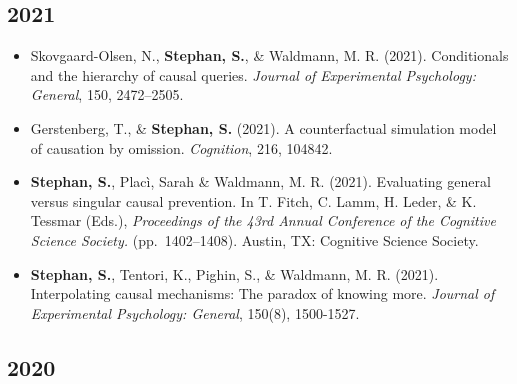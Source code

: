 \documentclass[
]{article}
\begin{document}
\hypertarget{section-6}{%
\subsection{2021}\label{section-6}}

\begin{itemize}
\item
  Skovgaard-Olsen, N., \textbf{Stephan, S.}, \& Waldmann, M. R. (2021).
  Conditionals and the hierarchy of causal queries. \emph{Journal of
  Experimental Psychology: General}, 150, 2472--2505.
  {\href{https://philarchive.org/archive/SKOCAT-2}{}}
  {\href{https://osf.io/fa9rj/}{}}
\item
  Gerstenberg, T., \& \textbf{Stephan, S.} (2021). A counterfactual
  simulation model of causation by omission. \emph{Cognition}, 216,
  104842.
  {\href{https://cicl.stanford.edu/papers/gerstenberg2021omission.pdf}{}}
  {\href{https://psyarxiv.com/wmh4c/}{}}
  {\href{https://osf.io/jubdz/}{}}
  {\href{https://github.com/cicl-stanford/omission}{}}
  {\href{https://osf.io/fu9rq}{}}
\item
  \textbf{Stephan, S.}, Placì, Sarah \& Waldmann, M. R. (2021).
  Evaluating general versus singular causal prevention. In T. Fitch, C.
  Lamm, H. Leder, \& K. Tessmar (Eds.), \emph{Proceedings of the 43rd
  Annual Conference of the Cognitive Science Society.} (pp.~1402--1408).
  Austin, TX: Cognitive Science Society.
  {\href{https://escholarship.org/uc/item/3z5870v4\#main}{}}
  {\href{https://simonstephan31.github.io/singular_prevention_proceedings/}{}}
  {\href{publications/Poster_Stephan_et_al_CogSci_2021.pdf}{}}
\item
  \textbf{Stephan, S.}, Tentori, K., Pighin, S., \& Waldmann, M. R.
  (2021). Interpolating causal mechanisms: The paradox of knowing more.
  \emph{Journal of Experimental Psychology: General}, 150(8), 1500-1527.
  {\href{https://doi.apa.org/fulltext/2021-13036-001.pdf}{}}
  {\href{https://osf.io/aqzps/}{}}
\end{itemize}

\hypertarget{section-7}{%
\subsection{2020}\label{section-7}}
\end{document}
